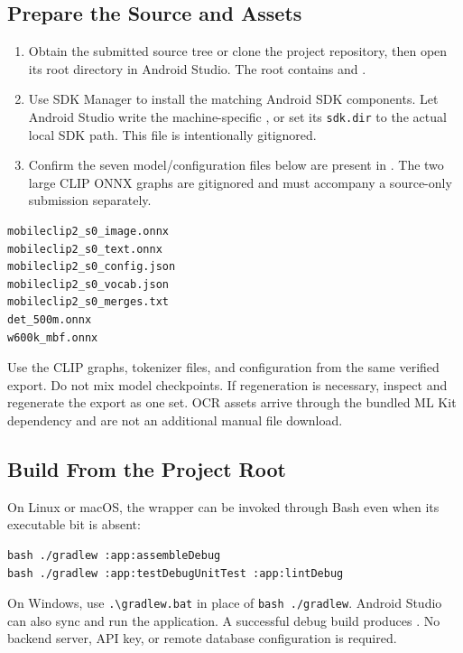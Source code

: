 \documentclass[11pt,a4paper]{article}
\newcommand{\code}[1]{{\small\texttt{#1}}}
\begin{document}
\subsection{Prepare the Source and Assets}
\begin{enumerate}
\item Obtain the submitted source tree or clone the project repository, then open its root directory in Android Studio. The root contains  and .
\item Use SDK Manager to install the matching Android SDK components. Let Android Studio write the machine-specific , or set its \code{sdk.dir} to the actual local SDK path. This file is intentionally gitignored.
\item Confirm the seven model/configuration files below are present in . The two large CLIP ONNX graphs are gitignored and must accompany a source-only submission separately.
\end{enumerate}

\begin{verbatim}
mobileclip2_s0_image.onnx
mobileclip2_s0_text.onnx
mobileclip2_s0_config.json
mobileclip2_s0_vocab.json
mobileclip2_s0_merges.txt
det_500m.onnx
w600k_mbf.onnx
\end{verbatim}

Use the CLIP graphs, tokenizer files, and configuration from the same verified export. Do not mix model checkpoints. If regeneration is necessary, inspect  and regenerate the export as one set. OCR assets arrive through the bundled ML Kit dependency and are not an additional manual file download.

\subsection{Build From the Project Root}
On Linux or macOS, the wrapper can be invoked through Bash even when its executable bit is absent:
\begin{verbatim}
bash ./gradlew :app:assembleDebug
bash ./gradlew :app:testDebugUnitTest :app:lintDebug
\end{verbatim}
On Windows, use \code{.\textbackslash gradlew.bat} in place of \code{bash ./gradlew}. Android Studio can also sync and run the application. A successful debug build produces . No backend server, API key, or remote database configuration is required.
\end{document}
